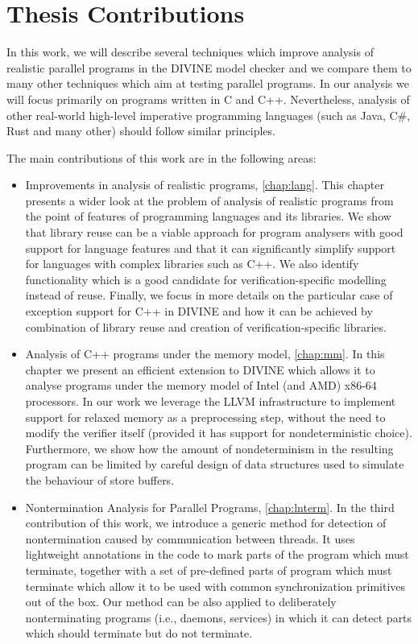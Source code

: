 \section{Thesis Contributions}

In this work, we will describe several techniques which improve analysis of realistic parallel programs in the DIVINE model checker and we compare them to many other techniques which aim at testing parallel programs.
In our analysis we will focus primarily on programs written in C and C++.
Nevertheless, analysis of other real-world high-level imperative programming
languages (such as Java, C\#, Rust and many other) should follow similar
principles.

The main contributions of this work are in the following areas:

\begin{itemize}
  \item Improvements in analysis of realistic programs, \autoref{chap:lang}.
    This chapter presents a wider look at the problem of analysis of realistic
    programs from the point of features of programming languages and its
    libraries.
    We show that library reuse can be a viable approach for program analysers
    with good support for language features and that it can significantly
    simplify support for languages with complex libraries such as C++.
    We also identify functionality which is a good candidate for
    verification-specific modelling instead of reuse.
    Finally, we focus in more details on the particular case of exception
    support for C++ in DIVINE and how it can be achieved by combination of
    library reuse and creation of verification-specific libraries.

  \item Analysis of C++ programs under the \xtso memory model, \autoref{chap:mm}.
    In this chapter we present an efficient extension to DIVINE which allows it to
    analyse programs under the memory model of Intel (and AMD) x86-64
    processors.
    In our work we leverage the LLVM infrastructure to implement support for
    relaxed memory as a preprocessing step, without the need to modify the
    verifier itself (provided it has support for nondeterministic choice).
    Furthermore, we show how the amount of nondeterminism in the resulting
    program can be limited by careful design of data structures used to
    simulate the behaviour of \xtso store buffers.

  \item Nontermination Analysis for Parallel Programs, \autoref{chap:lnterm}.
    In the third contribution of this work, we introduce a generic method for
    detection of nontermination caused by communication between threads.
    It uses lightweight annotations in the code to mark parts of the program
    which must terminate, together with a set of pre-defined parts of program
    which must terminate which allow it to be used with common synchronization
    primitives out of the box.
    Our method can be also applied to deliberately nonterminating
    programs (i.e., daemons, services) in which it can detect parts which
    should terminate but do not terminate.
\end{itemize}

